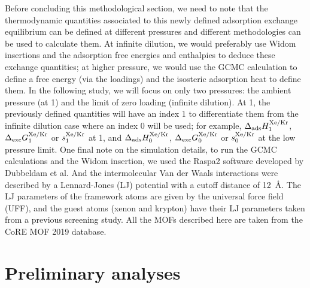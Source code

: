 \documentclass[main.tex]{subfiles}
\begin{document}
Before concluding this methodological section, we need to note that the thermodynamic quantities associated to this newly defined adsorption exchange equilibrium can be defined at different pressures and different methodologies can be used to calculate them. At infinite dilution, we would preferably use Widom insertions and the adsorption free energies and enthalpies to deduce these exchange quantities; at higher pressure, we would use the GCMC calculation to define a free energy (via the loadings) and the isosteric adsorption heat to define them. In the following study, we will focus on only two pressures: the ambient pressure (at \SI{1}{\atm}) and the limit of zero loading (infinite dilution). At \SI{1}{\atm}, the previously defined quantities will have an index $1$ to differentiate them from the infinite dilution case where an index $0$ will be used; for example, $\Delta_{\text{ads}}H_{\text{1}}^{\text{Xe/Kr}}$, $\Delta_{\text{exc}}G_{\text{1}}^{\text{Xe/Kr}}$ or $s_{\text{1}}^{\text{Xe/Kr}}$ at \SI{1}{\atm}, and $\Delta_{\text{ads}}H_{\text{0}}^{\text{Xe/Kr}}$, $\Delta_{\text{exc}}G_{\text{0}}^{\text{Xe/Kr}}$ or $s_{\text{0}}^{\text{Xe/Kr}}$ at the low pressure limit. One final note on the simulation details, to run the GCMC calculations and the Widom insertion, we used the Raspa2 software developed by Dubbeldam et al.\cite{dubbeldam2016} And the intermolecular Van der Waals interactions were described by a Lennard-Jones (LJ) potential with a cutoff distance of \SI{12}{\angstrom}. The LJ parameters of the framework atoms are given by the universal force field (UFF),\cite{rappe1992} and the guest atoms (xenon and krypton) have their LJ parameters taken from a previous screening study.\cite{Ryan_2010} All the MOFs described here are taken from the CoRE MOF 2019 database.\cite{Chung_2019}


\section{Preliminary analyses}
\end{document}
